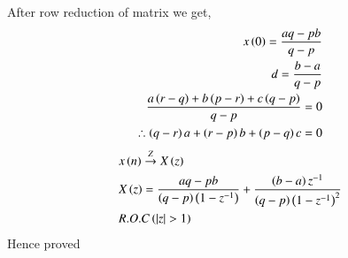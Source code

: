 \documentclass[journal,12pt,onecolumn]{IEEEtran}
\newcommand{\system}[1]{\stackrel{#1}{\rightarrow}}
\theoremstyle{remark}
\begin{document}
After row reduction of matrix we get,
\begin{align}
    x\brak{0}=\frac{aq-pb}{q-p}\\
    d=\frac{b-a}{q-p}\\
    \frac{a\brak{r-q} + b\brak{p-r} + c\brak{q-p}}{q-p}=0\\
    \therefore{\brak{q-r}a + \brak{r-p}b +\brak{p-q}c =0}
\end{align}
\begin{align}
    &x \brak{n} \system{Z} X \brak{z}\\
    &X\brak{z}=\frac{aq-pb}{\brak{q-p}\brak{1-z^{-1}}}+\frac{\brak{b-a}z^{-1}}{\brak{q-p}\brak{1-z^{-1}}^{2}}\\
    &R.O.C\brak{|z|>1}
\end{align}
Hence proved
\end{document}
